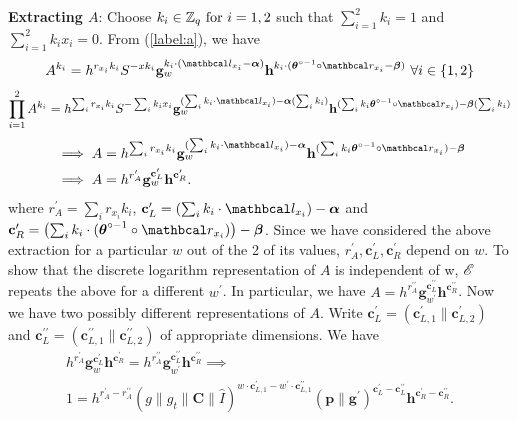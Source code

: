 \noindent
\textbf{Extracting $A$}: Choose $k_i \in \mathbb{Z}_q \text{ for } i=1,2$ such that $\sum_{i=1}^{2} k_i =1$ and $\sum_{i=1}^{2} k_ix_i =0$. From (\ref{label:a}), we have
\begin{gather*}
    A^{k_i} = h^{r_{x_i}k_i} S^{-x k_i} \textbf{g}_w^{k_i \cdot (\lvec_{x_i} - \vecnb{\alpha})} \textbf{h}^{k_i \cdot (\vecnb{\theta}^{\circ -1} \circ \rvec_{x_i} - \vecnb{\beta})} \ \forall i \in \{1,2\}
\end{gather*}
\begin{align*}
    \prod_{i=1}^{2} A^{k_i} = h^{\sum_{i} r_{x_i}k_i} S^{-\sum_{i} k_i x_i}  
    \textbf{g}_w^{ (\sum_{i} k_i \cdot \lvec_{x_i}) - \vecnb{\alpha}(\sum_{i} k_i)}
    \textbf{h}^{(\sum_{i} k_i \vecnb{\theta}^{\circ -1} \circ \rvec_{x_i}) - \vecnb{\beta}(\sum_{i} k_i)}
\end{align*}
\begin{align*}
    & \implies A = h^{\sum_{i} r_{x_i}k_i} 
    \textbf{g}_w^{(\sum_{i} k_i \cdot \lvec_{x_i}) - \vecnb{\alpha}}
    \textbf{h}^{(\sum_{i} k_i \vecnb{\theta}^{\circ -1} \circ \rvec_{x_i}) - \vecnb{\beta}}\\
    & \implies A = h^{r_A^{\prime}} \textbf{g}_w^{\textbf{c}_L^{\prime}} \textbf{h}^{\textbf{c}_R^{\prime}}.
\end{align*}
where $r_A^{\prime} = \sum_{i} r_{x_i}k_i$, $\textbf{c}_L^{\prime} = \left( \sum_{i}  k_i \cdot \lvec_{x_i} \right) - \vecnb{\alpha}$ and $\textbf{c}_R^{\prime} = \left(\sum_{i} k_i \cdot (\vecnb{\theta}^{\circ -1} \circ \rvec_{x_i}) \right) - \vecnb{\beta}$.
Since we have considered the above extraction for a particular $w$ out of the 2 of its values, $r_A^{\prime}, \textbf{c}_L^{\prime}, \textbf{c}_R^{\prime}$ depend on $w$. 
To show that the discrete logarithm representation of $A$ is independent of w, $\mathscr{E}$ repeats the above for a different $w^{\prime}$. In particular, we have $A= h^{r_A^{\prime \prime}} \textbf{g}_{w^{\prime}}^{\textbf{c}_L^{\prime \prime}} \textbf{h}^{\textbf{c}_R^{\prime \prime}}$. 
Now we have two possibly different representations of $A$. Write $\textbf{c}_L^{\prime} = (\textbf{c}_{L,1}^{\prime} \| \textbf{c}_{L,2}^{\prime})$  and $\textbf{c}_L^{\prime \prime} = (\textbf{c}_{L,1}^{\prime \prime} \| \textbf{c}_{L,2}^{\prime \prime})$ of appropriate dimensions. We have
\begin{gather*}
    h^{r_A^{\prime}} \textbf{g}_w^{\textbf{c}_L^{\prime}} \textbf{h}^{\textbf{c}_R^{\prime}} =
    h^{r_A^{\prime \prime}} \textbf{g}_{w^{\prime}}^{\textbf{c}_L^{\prime \prime}} \textbf{h}^{\textbf{c}_R^{\prime \prime}} \implies \\
    1 = h^{r_A^{\prime} - r_A^{\prime \prime}} 
    (g \| g_t \| \textbf{C} \| \hat{I})^{w \cdot \textbf{c}_{L,1}^{\prime} - w^{\prime} \cdot \textbf{c}_{L,1}^{\prime \prime}} 
    (\textbf{p}\|\textbf{g}^{\prime})^{\textbf{c}_{L}^{\prime} - \textbf{c}_{L}^{\prime \prime}}
    \textbf{h}^{\textbf{c}_{R}^{\prime} - \textbf{c}_{R}^{\prime \prime}}.
\end{gather*}

